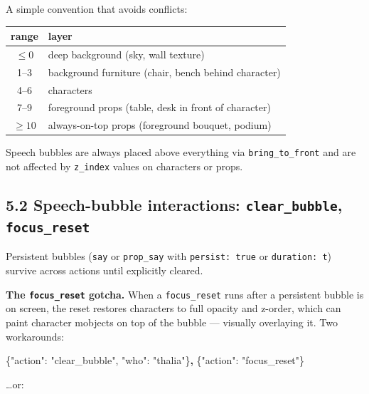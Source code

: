 \documentclass[
  11pt,
]{book}
\newenvironment{Shaded}{}{}
\newcommand{\DataTypeTok}[1]{\textcolor[rgb]{0.56,0.13,0.00}{#1}}
\newcommand{\ErrorTok}[1]{\textcolor[rgb]{1.00,0.00,0.00}{\textbf{#1}}}
\newcommand{\FunctionTok}[1]{\textcolor[rgb]{0.02,0.16,0.49}{#1}}
\newcommand{\StringTok}[1]{\textcolor[rgb]{0.25,0.44,0.63}{#1}}
\begin{document}
A simple convention that avoids conflicts:

\begin{center}
\begin{tabular}{cl}
\textbf{range} & \textbf{layer} \\
\hline
$\leq 0$ & deep background (sky, wall texture) \\
1--3 & background furniture (chair, bench behind character) \\
4--6 & characters \\
7--9 & foreground props (table, desk in front of character) \\
$\geq 10$ & always-on-top props (foreground bouquet, podium) \\
\end{tabular}
\end{center}

Speech bubbles are always placed above everything via
\texttt{bring\_to\_front} and are not affected by \texttt{z\_index}
values on characters or props.

\subsection{\texorpdfstring{5.2 Speech-bubble interactions:
\texttt{clear\_bubble},
\texttt{focus\_reset}}{5.2 Speech-bubble interactions: clear\_bubble, focus\_reset}}\label{speech-bubble-interactions-clear_bubble-focus_reset}

Persistent bubbles (\texttt{say} or \texttt{prop\_say} with
\texttt{persist:\ true} or \texttt{duration:\ t}) survive across actions
until explicitly cleared.

\textbf{The \texttt{focus\_reset} gotcha.} When a \texttt{focus\_reset}
runs after a persistent bubble is on screen, the reset restores
characters to full opacity and z-order, which can paint character
mobjects on top of the bubble --- visually overlaying it. Two
workarounds:

\begin{Shaded}
\begin{Highlighting}[]
\FunctionTok{\{}\DataTypeTok{"action"}\FunctionTok{:} \StringTok{"clear\_bubble"}\FunctionTok{,} \DataTypeTok{"who"}\FunctionTok{:} \StringTok{"thalia"}\FunctionTok{\}}\ErrorTok{,}
\FunctionTok{\{}\DataTypeTok{"action"}\FunctionTok{:} \StringTok{"focus\_reset"}\FunctionTok{\}}
\end{Highlighting}
\end{Shaded}

\ldots or:
\end{document}
